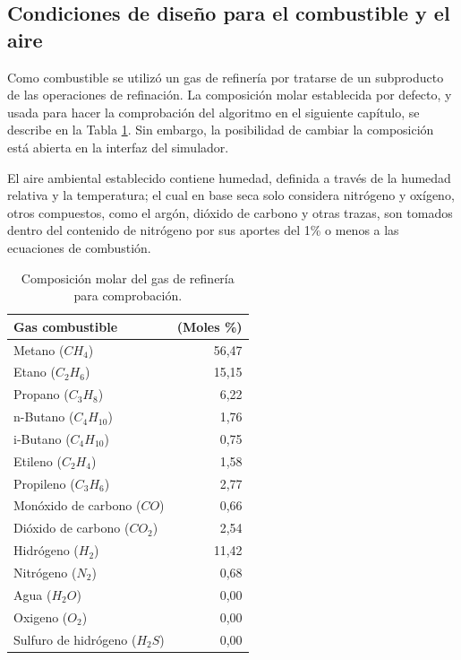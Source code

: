 \subsection{Condiciones de diseño para el combustible y el aire}
\par Como combustible se utilizó un gas de refinería por tratarse de un subproducto de las operaciones de refinación. La composición molar establecida por defecto, y usada para hacer la comprobación del algoritmo en el siguiente capítulo, se describe en la Tabla \ref{tbl:combustible}. Sin embargo, la posibilidad de cambiar la composición está abierta en la interfaz del simulador.
\par El aire ambiental establecido contiene humedad, definida a través de la humedad relativa y la temperatura; el cual en base seca solo considera nitrógeno y oxígeno, otros compuestos, como el argón, dióxido de carbono y otras trazas, son tomados dentro del contenido de nitrógeno por sus aportes del 1\% o menos a las ecuaciones de combustión.
\begin{table}[hbt]\begin{center}
\caption[Composición molar del gas de refinería]{Composición molar del gas de refinería para comprobación.}
\label{tbl:combustible}\begin{tabular}{l|r}
	Gas combustible					& (Moles \%) \\
	\hline
	Metano ($CH_4$)					& 56,47 \\
	Etano ($C_2H_6$)				& 15,15 \\
	Propano ($C_3H_8$)				& 6,22 \\
	n-Butano ($C_4H_{10}$)			& 1,76 \\
	i-Butano ($C_4H_{10}$)			& 0,75 \\
	Etileno ($C_2H_4$)				& 1,58 \\
	Propileno ($C_3H_6$)			& 2,77 \\
	Monóxido de carbono ($CO$)		& 0,66 \\
	Dióxido de carbono ($CO_2$)		& 2,54 \\
	Hidrógeno ($H_2$)				& 11,42 \\
	Nitrógeno ($N_2$)				& 0,68 \\
	Agua ($H_2O$)					& 0,00 \\
	Oxigeno ($O_2$)					& 0,00 \\
	Sulfuro de hidrógeno ($H_2S$)	& 0,00 \\
\end{tabular}\end{center}\end{table}
